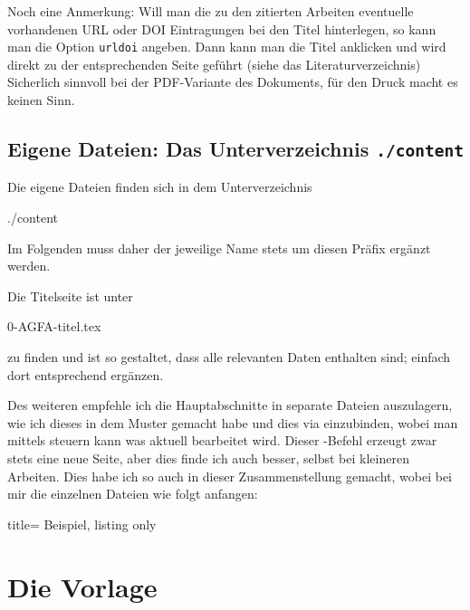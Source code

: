 Noch eine Anmerkung: Will man die zu den zitierten Arbeiten eventuelle vorhandenen URL oder DOI Eintragungen bei den Titel hinterlegen, so kann man die Option \texttt{urldoi} angeben. 
Dann kann man die Titel anklicken und wird direkt zu der entsprechenden Seite geführt (siehe das Literaturverzeichnis)
Sicherlich sinnvoll bei der PDF-Variante des Dokuments, für den Druck macht es keinen Sinn. 

\subsection{Eigene Dateien: Das Unterverzeichnis \texttt{./content}}\label{subsec:content}
%
Die eigene Dateien finden sich in dem Unterverzeichnis
%
\begin{tcolorbox}
./content
\end{tcolorbox}
%
Im Folgenden muss daher der jeweilige Name stets um diesen Präfix ergänzt werden.

Die Titelseite ist unter
%
\begin{tcolorbox}
0-AGFA-titel.tex
\end{tcolorbox}
%
zu finden und ist so gestaltet, dass alle relevanten Daten enthalten sind; einfach dort entsprechend ergänzen.

Des weiteren empfehle ich die Hauptabschnitte in separate Dateien auszulagern, wie ich dieses in dem Muster gemacht habe und dies via  einzubinden, wobei man mittels  steuern kann was aktuell bearbeitet wird.
Dieser -Befehl erzeugt zwar stets eine neue Seite, aber dies finde ich auch besser, selbst bei kleineren Arbeiten.
Dies habe ich so auch in dieser Zusammenstellung gemacht, wobei bei mir die einzelnen Dateien wie folgt anfangen:
%
\begin{tcblisting}{title= Beispiel, listing only}
\thispagestyle{empty}
\section{Die Vorlage}\label{sec:section1}
\end{tcblisting}

